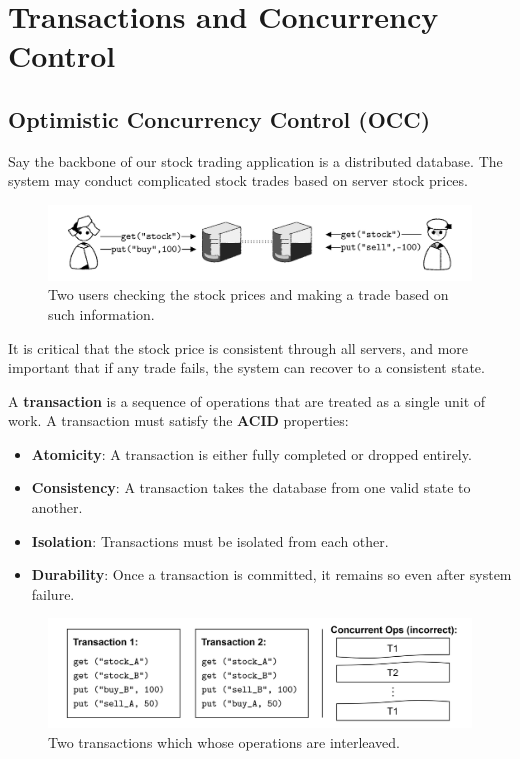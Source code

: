 \newpage 

\section{Transactions and Concurrency Control}
\subsection{Optimistic Concurrency Control (OCC)}
\label{sec:occ}

\noindent
Say the backbone of our stock trading application is a 
distributed database. The system may conduct complicated
stock trades based on server stock prices.
\begin{figure}[h]
    \centering
    \includegraphics[width=\textwidth]{Sections/trans/stock.png}
    \caption{Two users checking the stock prices and making a trade based on such information.}
    \label{fig:stock_trading}
\end{figure}

\noindent
It is critical that the stock price is consistent through all servers, and 
more important that if any trade fails, the system can recover to a consistent state.

\begin{Def}[Transaction]

    A \textbf{transaction} is a sequence of operations that are treated as a single unit of work.
    A transaction must satisfy the \textbf{ACID} properties:
    \begin{itemize}
        \item \textbf{Atomicity}: A transaction is either fully completed or dropped entirely.
        \item \textbf{Consistency}:  A transaction takes the database from one valid state to another.
        \item \textbf{Isolation}: Transactions must be isolated from each other.
        \item \textbf{Durability}: Once a transaction is committed, it remains so even after system failure.
    \end{itemize}
\end{Def}

\vspace{-0.5em}
\begin{figure}[h]
    \centering 
    \includegraphics[width=\textwidth]{Sections/trans/stock_2.png}
    \caption{Two transactions which whose operations are interleaved.}
    \label{fig:stock_trading}
\end{figure}

